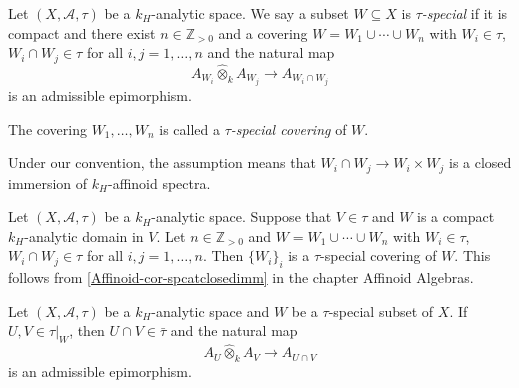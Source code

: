 \begin{definition}
    Let  $(X,\mathcal{A},\tau)$ be a $k_H$-analytic space. We say a subset $W\subseteq X$ is \emph{$\tau$-special} if it is compact and there exist $n\in \mathbb{Z}_{>0}$ and a covering $W=W_1\cup \cdots \cup W_n$  with $W_i\in \tau$, $W_i\cap W_j\in \tau$ for all $i,j=1,\ldots,n$ and the natural map
    \[
        A_{W_i}\hat{\otimes}_k A_{W_j}\rightarrow A_{W_i\cap W_j}  
    \]
    is an admissible epimorphism.

    The covering $W_1,\ldots,W_n$ is called a \emph{$\tau$-special covering} of $W$.
\end{definition}
Under our convention, the assumption means that $W_i\cap W_j\rightarrow W_i\times W_j$ is a closed immersion of $k_H$-affinoid spectra.


\begin{example}
    Let  $(X,\mathcal{A},\tau)$ be a $k_H$-analytic space.
    Suppose that $V\in \tau$ and $W$ is a compact $k_H$-analytic domain in $V$. Let $n\in \mathbb{Z}_{>0}$ and $W=W_1\cup \cdots \cup W_n$  with $W_i\in \tau$, $W_i\cap W_j\in \tau$ for all $i,j=1,\ldots,n$. Then $\{W_i\}_i$ is a $\tau$-special covering of $W$. This follows from \cref{Affinoid-cor-spcatclosedimm} in the chapter Affinoid Algebras.
\end{example}


\begin{lemma}\label{lma-tauspecialanycov}
    Let  $(X,\mathcal{A},\tau)$ be a $k_H$-analytic space and $W$ be a $\tau$-special subset of $X$. If $U,V\in \tau|_W$, then $U\cap V\in \bar{\tau}$ and the natural map
    \[
        A_U\hat{\otimes}_k A_V\rightarrow A_{U\cap V}
    \]
    is an admissible epimorphism.
\end{lemma}

